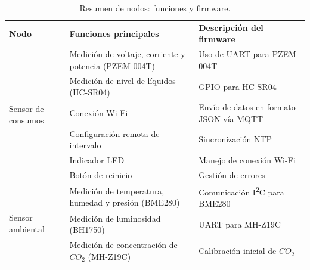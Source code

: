 \begin{table}[H]
    \centering
    \caption[Resumen de nodos]{Resumen de nodos: funciones y firmware.}
    \begin{tabular}{p{1.7cm}p{5.3cm}p{4.9cm}}
        \hline
        \textbf{Nodo}                                     & \textbf{Funciones principales}                                                & \textbf{Descripción del firmware}              \\
        \multirow{6}{1.7cm}{Sensor de consumos}           & Medición de voltaje, corriente y potencia (PZEM-004T)                         & Uso de UART para PZEM-004T                     \\
                                                          & Medición de nivel de líquidos (HC-SR04)                                       & GPIO para HC-SR04                              \\
                                                          & Conexión Wi-Fi                                                                & Envío de datos en formato JSON vía MQTT        \\
                                                          & Configuración remota de intervalo                                             & Sincronización NTP                             \\
                                                          & Indicador LED                                                                 & Manejo de conexión Wi-Fi                       \\
                                                          & Botón de reinicio                                                             & Gestión de errores                             \\
        \hline
        \multirow{7}{1.7cm}{Sensor ambiental}             & Medición de temperatura, humedad y presión (BME280)                           & Comunicación I\textsuperscript{2}C para BME280 \\
                                                          & Medición de luminosidad (BH1750)                                              & UART para MH-Z19C                              \\
                                                          & Medición de concentración de $CO_2$ (MH-Z19C)                                 & Calibración inicial de $CO_2$                  \\

\end{tabular}
\end{table}
